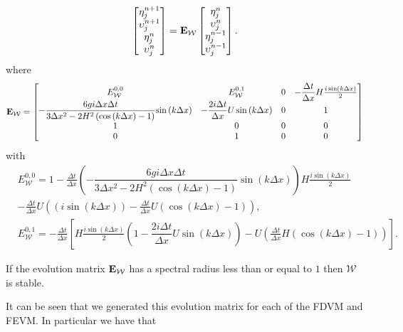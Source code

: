 \begin{equation}
\begin{bmatrix}
\eta^{n+1}_j \\
\upsilon^{n+1}_j\\
\eta^n_j \\
\upsilon^n_j
\end{bmatrix}= \mathbf{E}_{\mathcal{W}}  \begin{bmatrix}
\eta^{n}_j \\
\upsilon^{n}_j\\
\eta^{n-1}_j \\
\upsilon^{n-1}_j
\end{bmatrix}.
\end{equation}
where
\begin{equation}
\mathbf{E}_{\mathcal{W}} = \begin{bmatrix}
{E}_{\mathcal{W}}^{0,0} & {E}_{\mathcal{W}}^{0,1} & 0 & - \dfrac{\Delta t}{\Delta x}H\frac{i\sin\left(k\Delta x\right)}{2} \\
-\dfrac{6 gi \Delta x\Delta t}{3 \Delta x^2 -2{H^2} \left( \cos\left(k \Delta x\right) - 1 \right)}{ \sin\left(k \Delta x\right)} & -\dfrac{2i \Delta t }{\Delta x} U \sin\left(k \Delta x\right)&0 & 1 \\
1&0&0&0\\
0&1&0&0
\end{bmatrix}
\end{equation}
with
\begin{align*}
&{E}_{\mathcal{W}}^{0,0} = 1 - \frac{\Delta t}{\Delta x}\left(-\dfrac{6 gi \Delta x\Delta t}{3 \Delta x^2 -2{H^2} \left( \cos\left(k \Delta x\right) - 1 \right)}{ \sin\left(k \Delta x\right)}\right)H\frac{i\sin\left(k\Delta x\right)}{2} \\ &- \frac{\Delta t}{\Delta x}U\left(\left(i\sin\left(k\Delta x\right)\right) - \frac{\Delta t}{\Delta x}U\left(\cos\left(k\Delta x\right) - 1\right)\right), \\
&{E}_{\mathcal{W}}^{0,1} = - \frac{\Delta t}{\Delta x} \left[H\frac{i\sin\left(k\Delta x\right)}{2}\left( 1 -\dfrac{2i \Delta t }{\Delta x} U \sin\left(k \Delta x\right) \right)   -U\left(\frac{\Delta t}{\Delta x}H\left(\cos\left(k\Delta x\right) - 1\right)\right) \right].
\end{align*}


If the evolution matrix $\mathbf{E}_{\mathcal{W}}$ has a spectral radius less than or equal to $1$ then $\mathcal{W}$ is stable.

It can be seen that we generated this evolution matrix for each of the FDVM and FEVM. In particular we have that

